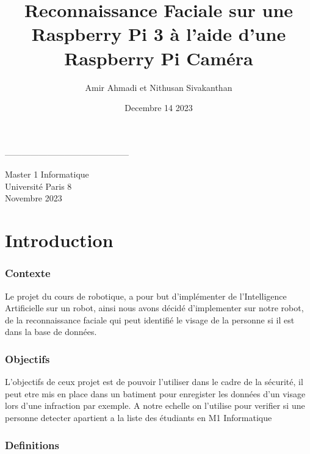 \documentclass{article}
\title{Reconnaissance Faciale sur une Raspberry Pi 3 à l’aide d’une Raspberry Pi Caméra}
\author{Amir Ahmadi et Nithusan Sivakanthan}
\date{Decembre 14 2023}
\begin{document}
\begin{titlepage}
    \centering

    \vspace{4cm}
    
    {\huge\bfseries \maketitle}

    \vspace{4cm}
    
    --------------------------------------------

    \vspace{1cm}

    Master 1 Informatique\\
    Université Paris 8\\
    Novembre 2023
\end{titlepage}

\newpage
\renewcommand{\contentsname}{Table des matières} 
\tableofcontents

\newpage



\part{Introduction}

\section{Contexte}
Le projet du cours de robotique, a pour but d’implémenter  de l'Intelligence Artificielle sur un robot, ainsi nous avons décidé d'implementer sur notre robot, de la reconnaissance faciale qui peut identifié le visage de la personne si il est dans la base de données.

\section{Objectifs}%
L'objectifs de ceux projet est de pouvoir l'utiliser dans le cadre de la sécurité, il peut etre mis en place
dans un batiment pour enregister les données d'un visage lors d'une infraction par exemple.
A notre echelle on l'utilise pour verifier si une personne detecter apartient a la liste des étudiants en M1 Informatique

\section{Definitions}
\end{document}
